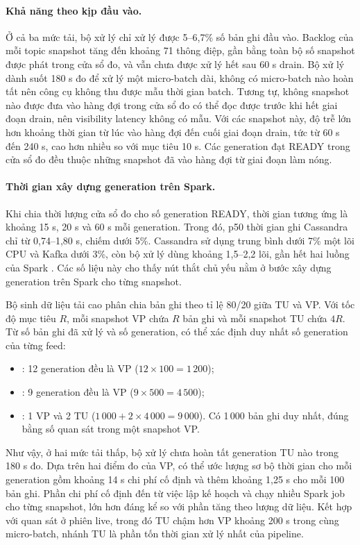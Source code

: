 \paragraph{Khả năng theo kịp đầu vào.} Ở cả ba mức tải, bộ xử lý chỉ xử lý được 5--6,7\% số bản ghi đầu vào. Backlog của mỗi topic snapshot tăng đến khoảng 71 thông điệp, gần bằng toàn bộ số snapshot được phát trong cửa sổ đo, và vẫn chưa được xử lý hết sau 60 s drain. Bộ xử lý dành suốt 180 s đo để xử lý một micro-batch dài, không có micro-batch nào hoàn tất nên công cụ không thu được mẫu thời gian batch. Tương tự, không snapshot nào được đưa vào hàng đợi trong cửa sổ đo có thể đọc được trước khi hết giai đoạn drain, nên visibility latency không có mẫu. Với các snapshot này, độ trễ lớn hơn khoảng thời gian từ lúc vào hàng đợi đến cuối giai đoạn drain, tức từ 60 s đến 240 s, cao hơn nhiều so với mục tiêu 10 s. Các generation đạt READY trong cửa sổ đo đều thuộc những snapshot đã vào hàng đợi từ giai đoạn làm nóng.

\paragraph{Thời gian xây dựng generation trên Spark.} Khi chia thời lượng cửa sổ đo cho số generation READY, thời gian tương ứng là khoảng 15 s, 20 s và 60 s mỗi generation. Trong đó, p50 thời gian ghi Cassandra chỉ từ 0,74--1,80 s, chiếm dưới 5\%. Cassandra sử dụng trung bình dưới 7\% một lõi CPU và Kafka dưới 3\%, còn bộ xử lý dùng khoảng 1,5--2,2 lõi, gần hết hai luồng của Spark . Các số liệu này cho thấy nút thắt chủ yếu nằm ở bước xây dựng generation trên Spark cho từng snapshot.

Bộ sinh dữ liệu tải cao phân chia bản ghi theo tỉ lệ 80/20 giữa TU và VP. Với tốc độ mục tiêu $R$, mỗi snapshot VP chứa $R$ bản ghi và mỗi snapshot TU chứa $4R$. Từ số bản ghi đã xử lý và số generation, có thể xác định duy nhất số generation của từng feed:
\begin{itemize}
    \item {}: 12 generation đều là VP ($12 \times 100 = 1\,200$);
    \item {}: 9 generation đều là VP ($9 \times 500 = 4\,500$);
    \item {}: 1 VP và 2 TU ($1\,000 + 2 \times 4\,000 = 9\,000$). Có 1\,000 bản ghi duy nhất, đúng bằng số quan sát trong một snapshot VP.
\end{itemize}
Như vậy, ở hai mức tải thấp, bộ xử lý chưa hoàn tất generation TU nào trong 180 s đo. Dựa trên hai điểm đo của VP, có thể ước lượng sơ bộ thời gian cho mỗi generation gồm khoảng 14 s chi phí cố định và thêm khoảng 1,25 s cho mỗi 100 bản ghi. Phần chi phí cố định đến từ việc lập kế hoạch và chạy nhiều Spark job cho từng snapshot, lớn hơn đáng kể so với phần tăng theo lượng dữ liệu. Kết hợp với quan sát ở phiên live, trong đó TU chậm hơn VP khoảng 200 s trong cùng micro-batch, nhánh TU là phần tốn thời gian xử lý nhất của pipeline.

